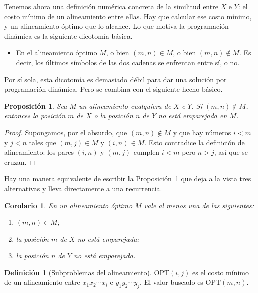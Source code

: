 \documentclass[12pt, spanish, oneside, openany]{book}
\theoremstyle{uprightplain}
\newtheorem{proposicion}[teorema]{Proposición}
\newtheorem{corolario}[teorema]{Corolario}
\theoremstyle{definition}
\newtheorem{definicion}[teorema]{Definición}
\theoremstyle{remark}
\theoremstyle{definition}
\newcommand{\OPT}{\mathrm{OPT}} %
\begin{document}
Tenemos ahora una definición numérica concreta de la similitud entre $X$ e $Y$: el costo mínimo de un alineamiento entre ellas. Hay que calcular ese costo mínimo, y un alineamiento óptimo que lo alcance. Lo que motiva la programación dinámica es la siguiente dicotomía básica.
\begin{itemize}
    \item En el alineamiento óptimo $M$, o bien $(m,n)\in M$, o bien $(m,n)\notin M$. Es decir, los últimos símbolos de las dos cadenas se enfrentan entre sí, o no.
\end{itemize}
Por sí sola, esta dicotomía es demasiado débil para dar una solución por programación dinámica. Pero se combina con el siguiente hecho básico.

\begin{proposicion}
\label{prop:dp-alineamiento-ultimo}
Sea $M$ un alineamiento cualquiera de $X$ e $Y$. Si $(m,n)\notin M$, entonces la posición $m$ de $X$ o la posición $n$ de $Y$ no está emparejada en $M$.
\end{proposicion}
\begin{proof}
Supongamos, por el absurdo, que $(m,n)\notin M$ y que hay números $i<m$ y $j<n$ tales que $(m,j)\in M$ y $(i,n)\in M$. Esto contradice la definición de alineamiento: los pares $(i,n)$ y $(m,j)$ cumplen $i<m$ pero $n>j$, así que se cruzan.
\end{proof}

Hay una manera equivalente de escribir la Proposición~\ref{prop:dp-alineamiento-ultimo} que deja a la vista tres alternativas y lleva directamente a una recurrencia.

\begin{corolario}
\label{cor:dp-alineamiento-tres-casos}
En un alineamiento óptimo $M$ vale al menos una de las siguientes:
\begin{enumerate}[label=(\roman*)]
    \item $(m,n)\in M$;
    \item la posición $m$ de $X$ no está emparejada;
    \item la posición $n$ de $Y$ no está emparejada.
\end{enumerate}
\end{corolario}

\begin{definicion}[Subproblemas del alineamiento]
\label{def:dp-opt-alineamiento}
$\OPT(i,j)$ es el costo mínimo de un alineamiento entre $x_1x_2\cdots x_i$ e $y_1y_2\cdots y_j$. El valor buscado es $\OPT(m,n)$.
\end{definicion}
\end{document}
